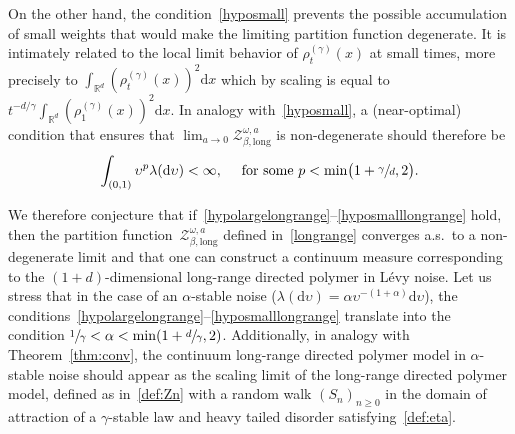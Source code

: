 \documentclass[JEP,XML,SOM,Unicode,published]{cedram}
\let\mathcal\mathscr
\theoremstyle{definition}
\newcommand{\dd}{\mathrm{d}}
\newcommand{\cZ}{{\ensuremath{\mathcal Z}} }
\newcommand{\bbR}{{\ensuremath{\mathbb R}} }
\let\ga\alpha
\let\gb\beta
\let\ups\upsilon
\let\go\omega
\begin{document}
On the other hand, the condition~\eqref{hyposmall}
prevents the possible accumulation of small weights that would make the limiting partition function degenerate.
It is intimately related to the local limit behavior of $\rho_t^{(\gamma)}(x)$ at small times, more precisely to
$\int_{\bbR^d} (\rho_t^{(\gamma)}(x))^2 \dd x$ which by scaling is equal to $t^{-d/\gamma} \int_{\bbR^d} (\rho_1^{(\gamma)}(x))^2 \dd x.$
In analogy with~\eqref{hyposmall}, a (near-optimal) condition that ensures that $ \lim_{a\to 0}\cZ_{\gb, \mathrm{long}}^{\go,a}$ is non-degenerate should therefore be
\begin{equation}
\label{hyposmalllongrange}
\int_{(0,1)} \ups^{p} \lambda(\dd \ups) <\infty,\quad \text{ for some } p< \min \bigl(1+\sfrac{\gamma}{d}, 2 \bigr).
\end{equation}

We therefore conjecture that if~\eqref{hypolargelongrange}--\eqref{hyposmalllongrange} hold,
then the partition function~$\cZ_{\gb,\mathrm{long}}^{\go,a}$ defined in~\eqref{longrange} converges a.s.\ to a non-degenerate limit and that one can construct a continuum measure corresponding to the $(1+d)$-dimensional long-range directed polymer in Lévy noise.
Let us stress that in the case of an $\ga$-stable noise (\ie $\lambda(\dd \ups) = \ga \ups^{-(1+\ga)} \dd \ups$),
the conditions~\eqref{hypolargelongrange}--\eqref{hyposmalllongrange} translate into the condition $\sfrac1\gamma < \ga < \min(1+\sfrac{d}{\gamma}, 2)$.
Additionally, in analogy with Theorem~\ref{thm:conv}, the continuum long-range directed polymer model in $\ga$-stable noise should appear
as the scaling limit of the long-range
directed polymer model, defined as in~\eqref{def:Zn}
with a random walk $(S_n)_{n\geq 0}$
in the domain of attraction of a $\gamma$-stable law
and heavy tailed disorder satisfying~\eqref{def:eta}.
\end{document}
